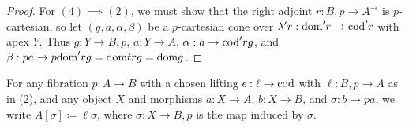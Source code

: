 \documentclass[../thesis.tex]{subfiles}
\begin{document}
\begin{proof}
    For $(4) \implies (2)$, we must show that the right adjoint $r : B \comma p \to A^\to$ is $p$-cartesian, so let
    $(g,a,\alpha,\beta)$ be a $p$-cartesian cone over $\lambda' r : {\mathrm{dom}}' r \to {\mathrm{cod}}' r$ with apex $Y$. Thus
    $g : Y \to B \comma p$, $a : Y \to A$, $\alpha : a \to {\mathrm{cod}}'r g$, and $\beta : pa \to p{\mathrm{dom}}'rg = {\mathrm{dom}} trg
    = {\mathrm{dom}} g$.
  \end{proof}

  \begin{notation}
    For any fibration $p : A \to B$ with a chosen lifting $\epsilon : \ell \to {\mathrm{cod}}$ with $\ell : B \comma p \to A$
    as in (2), and any object $X$ and morphisms $a : X \to A$, $b : X \to B$, and $\sigma : b \to pa$, we write
    $A[\sigma] \coloneq \ell\bar\sigma$, where $\bar \sigma : X \to B \comma p$ is the map induced by $\sigma$.
  \end{notation}
  
\end{document}
